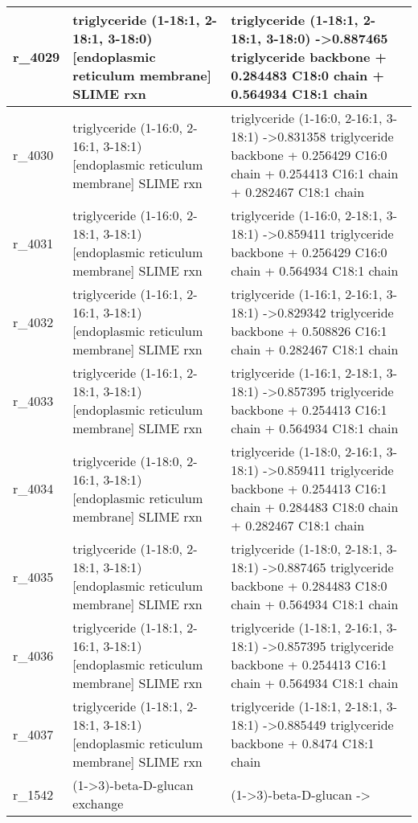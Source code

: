 \begin{landscape}
{\begin{longtable}{|l|p{7cm}|p{15cm}|}
r\_4029 & triglyceride (1-18:1, 2-18:1, 3-18:0) {[}endoplasmic reticulum membrane{]} SLIME rxn & triglyceride (1-18:1, 2-18:1, 3-18:0)  -\textgreater 0.887465 triglyceride backbone + 0.284483 C18:0 chain + 0.564934 C18:1 chain \\ \hline
r\_4030 & triglyceride (1-16:0, 2-16:1, 3-18:1) {[}endoplasmic reticulum membrane{]} SLIME rxn & triglyceride (1-16:0, 2-16:1, 3-18:1)  -\textgreater 0.831358 triglyceride backbone + 0.256429 C16:0 chain + 0.254413 C16:1 chain + 0.282467 C18:1 chain \\ \hline
r\_4031 & triglyceride (1-16:0, 2-18:1, 3-18:1) {[}endoplasmic reticulum membrane{]} SLIME rxn & triglyceride (1-16:0, 2-18:1, 3-18:1)  -\textgreater 0.859411 triglyceride backbone + 0.256429 C16:0 chain + 0.564934 C18:1 chain \\ \hline
r\_4032 & triglyceride (1-16:1, 2-16:1, 3-18:1) {[}endoplasmic reticulum membrane{]} SLIME rxn & triglyceride (1-16:1, 2-16:1, 3-18:1)  -\textgreater 0.829342 triglyceride backbone + 0.508826 C16:1 chain + 0.282467 C18:1 chain \\ \hline
r\_4033 & triglyceride (1-16:1, 2-18:1, 3-18:1) {[}endoplasmic reticulum membrane{]} SLIME rxn & triglyceride (1-16:1, 2-18:1, 3-18:1)  -\textgreater 0.857395 triglyceride backbone + 0.254413 C16:1 chain + 0.564934 C18:1 chain \\ \hline
r\_4034 & triglyceride (1-18:0, 2-16:1, 3-18:1) {[}endoplasmic reticulum membrane{]} SLIME rxn & triglyceride (1-18:0, 2-16:1, 3-18:1)  -\textgreater 0.859411 triglyceride backbone + 0.254413 C16:1 chain + 0.284483 C18:0 chain + 0.282467 C18:1 chain \\ \hline
r\_4035 & triglyceride (1-18:0, 2-18:1, 3-18:1) {[}endoplasmic reticulum membrane{]} SLIME rxn & triglyceride (1-18:0, 2-18:1, 3-18:1)  -\textgreater 0.887465 triglyceride backbone + 0.284483 C18:0 chain + 0.564934 C18:1 chain \\ \hline
r\_4036 & triglyceride (1-18:1, 2-16:1, 3-18:1) {[}endoplasmic reticulum membrane{]} SLIME rxn & triglyceride (1-18:1, 2-16:1, 3-18:1)  -\textgreater 0.857395 triglyceride backbone + 0.254413 C16:1 chain + 0.564934 C18:1 chain \\ \hline
r\_4037 & triglyceride (1-18:1, 2-18:1, 3-18:1) {[}endoplasmic reticulum membrane{]} SLIME rxn & triglyceride (1-18:1, 2-18:1, 3-18:1)  -\textgreater 0.885449 triglyceride backbone + 0.8474 C18:1 chain \\ \hline
r\_1542 & (1-\textgreater{}3)-beta-D-glucan exchange & (1-\textgreater{}3)-beta-D-glucan  -\textgreater{} \\ \hline

\end{longtable}}
\end{landscape}
